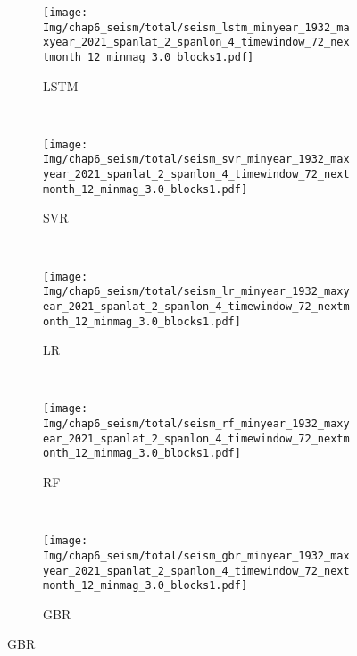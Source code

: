 \begin{figure}[!htbp]
  \centering
  \begin{subfigure}[b]{0.45\textwidth}
    \caption{LSTM}
    \texttt{[image: Img/chap6\_seism/total/seism\_lstm\_minyear\_1932\_maxyear\_2021\_spanlat\_2\_spanlon\_4\_timewindow\_72\_nextmonth\_12\_minmag\_3.0\_blocks1.pdf]}
    \vspace{-1cm}
    \label{fig:seism_lstm_minyear_1932_maxyear_2021_spanlat_2_spanlon_4_timewindow_72_nextmonth_12_minmag_3.0_blocks1}
  \end{subfigure}
  ~
  \begin{subfigure}[b]{0.45\textwidth}
    \caption{SVR} 
    \texttt{[image: Img/chap6\_seism/total/seism\_svr\_minyear\_1932\_maxyear\_2021\_spanlat\_2\_spanlon\_4\_timewindow\_72\_nextmonth\_12\_minmag\_3.0\_blocks1.pdf]}
    \vspace{-1cm}
    \label{fig:seism_svr_minyear_1932_maxyear_2021_spanlat_2_spanlon_4_timewindow_72_nextmonth_12_minmag_3.0_blocks1}
  \end{subfigure}   
  \\
  \begin{subfigure}[b]{0.45\textwidth}
      \caption{LR}
      \vspace{-0.2cm}
      \texttt{[image: Img/chap6\_seism/total/seism\_lr\_minyear\_1932\_maxyear\_2021\_spanlat\_2\_spanlon\_4\_timewindow\_72\_nextmonth\_12\_minmag\_3.0\_blocks1.pdf]}
      \vspace{-1cm}
      \label{fig:seism_lr_minyear_1932_maxyear_2021_spanlat_2_spanlon_4_timewindow_72_nextmonth_12_minmag_3.0_blocks1}
  \end{subfigure}
  ~
  \begin{subfigure}[b]{0.45\textwidth}
    \caption{RF}
    \vspace{-0.2cm}
    \texttt{[image: Img/chap6\_seism/total/seism\_rf\_minyear\_1932\_maxyear\_2021\_spanlat\_2\_spanlon\_4\_timewindow\_72\_nextmonth\_12\_minmag\_3.0\_blocks1.pdf]}
    \vspace{-1cm}
    \label{fig:seism_rf_minyear_1932_maxyear_2021_spanlat_2_spanlon_4_timewindow_72_nextmonth_12_minmag_3.0_blocks1}
  \end{subfigure}
  \\
  \begin{subfigure}[b]{0.45\textwidth}
    \caption{GBR}
    \vspace{-0.2cm}
    \texttt{[image: Img/chap6\_seism/total/seism\_gbr\_minyear\_1932\_maxyear\_2021\_spanlat\_2\_spanlon\_4\_timewindow\_72\_nextmonth\_12\_minmag\_3.0\_blocks1.pdf]}

\end{subfigure}
\end{figure}
